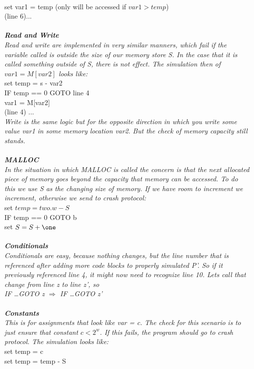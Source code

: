\documentclass[11pt]{article}
\begin{document}
\begin{enumerate}
\\set var1 = temp (only will be accessed if $var1 > temp$)
\\(line 6)...
\\
\textit{
\\ \textbf{Read and Write}
\\ Read and write are implemented in very similar manners, which fail if the variable called is outside the size of our memory store S. In the case that it is called something outside of S, there is not effect. The simulation then of $var1 = M[var2]$ looks like:
}
\\ set temp = s - var2 
\\ IF temp == 0 GOTO line 4
\\ var1 = M[var2] 
\\ (line 4) ... 
\\
\textit{Write is the same logic but for the opposite direction in which you write some value var1 in some memory location var2. But the check of memory capacity still stands. \\
\\ \textbf{MALLOC}
\\ In the situation in which MALLOC is called the concern is that the next allocated piece of memory goes beyond the capacity that memory can be accessed. To do this we use S as the changing size of memory. If we have room to increment we increment, otherwise we send to crash protocol:
}
\\ set $temp = two.w - S$
\\ IF temp == 0 GOTO b
\\ set $S = S + \one$
\\
\\ 
\textit{
\textbf{Conditionals}
\\ Conditionals are easy, because nothing changes, but the line number that is referenced after adding more code blocks to properly simulated P'. So if it previously referenced line 4, it might now need to recognize line 10. Lets call that change from line z to line z', so
\\IF \dots GOTO z $\Rightarrow$ IF \dots GOTO z'
\\\\
\textbf{Constants}
\\This is for assignments that look like var = c. The check for this scenario is to just ensure that constant $c < 2^w$. If this fails, the program should go to crash protocol. The simulation looks like: }
\\set temp = c
\\set temp = temp - S

\end{enumerate}
\end{document}
